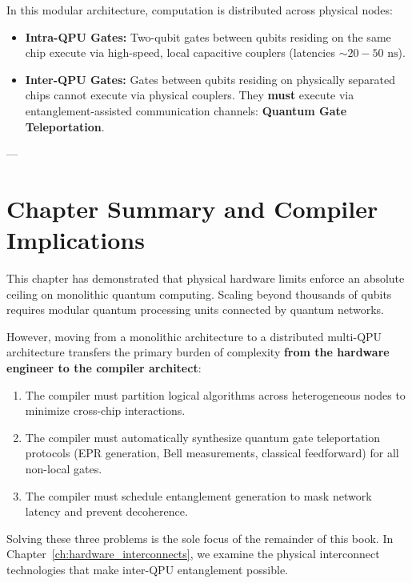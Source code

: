 In this modular architecture, computation is distributed across physical nodes:
\begin{itemize}
    \item \textbf{Intra-QPU Gates:} Two-qubit gates between qubits residing on the same chip execute via high-speed, local capacitive couplers (latencies $\sim 20-50\text{ ns}$).
    \item \textbf{Inter-QPU Gates:} Gates between qubits residing on physically separated chips cannot execute via physical couplers. They \textbf{must} execute via entanglement-assisted communication channels: \textbf{Quantum Gate Teleportation}.
\end{itemize}

---

\section{Chapter Summary and Compiler Implications}
This chapter has demonstrated that physical hardware limits enforce an absolute ceiling on monolithic quantum computing. Scaling beyond thousands of qubits requires modular quantum processing units connected by quantum networks.

However, moving from a monolithic architecture to a distributed multi-QPU architecture transfers the primary burden of complexity \textbf{from the hardware engineer to the compiler architect}:
\begin{enumerate}
    \item The compiler must partition logical algorithms across heterogeneous nodes to minimize cross-chip interactions.
    \item The compiler must automatically synthesize quantum gate teleportation protocols (EPR generation, Bell measurements, classical feedforward) for all non-local gates.
    \item The compiler must schedule entanglement generation to mask network latency and prevent decoherence.
\end{enumerate}

Solving these three problems is the sole focus of the remainder of this book. In Chapter~\ref{ch:hardware_interconnects}, we examine the physical interconnect technologies that make inter-QPU entanglement possible.
